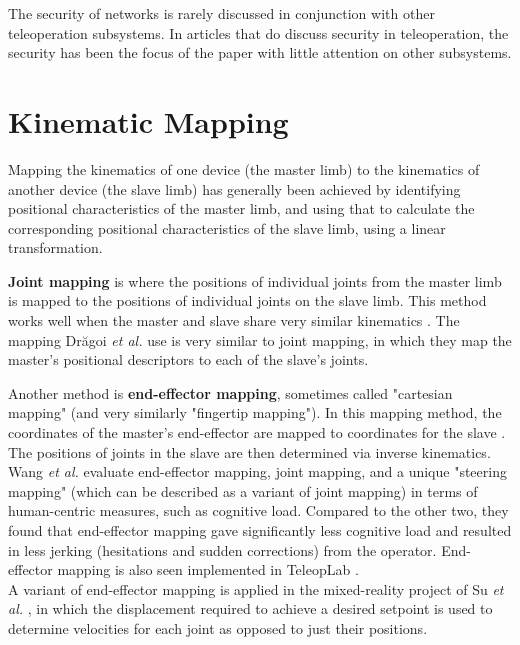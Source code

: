 The security of networks is rarely discussed in conjunction with other teleoperation subsystems. In articles that do discuss security in teleoperation, the security has been the focus of the paper with little attention on other subsystems.

\newpage
\section{Kinematic Mapping}\label{sec_lit:kinematic_mapping}

Mapping the kinematics of one device (the master limb) to the kinematics of another device (the slave limb) has generally been achieved by identifying positional characteristics of the master limb, and using that to calculate the corresponding positional characteristics of the slave limb, using a linear transformation.

\textbf{Joint mapping} is where the positions of individual joints from the master limb is mapped to the positions of individual joints on the slave limb. This method works well when the master and slave share very similar kinematics \cite{bib:teleoperation_survey}. The mapping Drăgoi \textit{et al.} \cite{bib:teleoperation_intuitive_using_MediaPipeHands} use is very similar to joint mapping, in which they map the master's positional descriptors to each of the slave's joints.

Another method is \textbf{end-effector mapping}, sometimes called "cartesian mapping" (and very similarly "fingertip mapping"). In this mapping method, the coordinates of the master's end-effector are mapped to coordinates for the slave \cite{bib:teleoperation_survey}. The positions of joints in the slave are then determined via inverse kinematics.\\
Wang \textit{et al.} \cite{bib:teleoperation_surgery} evaluate end-effector mapping, joint mapping, and a unique "steering mapping" (which can be described as a variant of joint mapping) in terms of human-centric measures, such as cognitive load. Compared to the other two, they found that end-effector mapping gave significantly less cognitive load and resulted in less jerking (hesitations and sudden corrections) from the operator. End-effector mapping is also seen implemented in TeleopLab \cite{bib:teleoperation_TeleopLab}.\\
A variant of end-effector mapping is applied in the mixed-reality project of Su \textit{et al.} \cite{bib:teleoperation_mixed_reality}, in which the displacement required to achieve a desired setpoint is used to determine velocities for each joint as opposed to just their positions.

